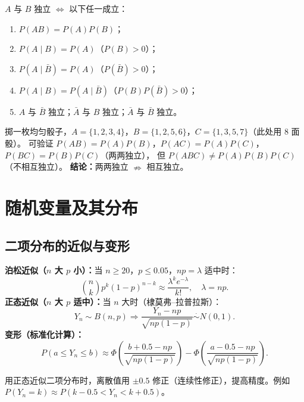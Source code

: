 \documentclass[11pt,a4paper]{article}
\begin{document}
\begin{variation}[独立性的等价表述]
$A$ 与 $B$ 独立 $\iff$ 以下任一成立：
\begin{enumerate}[leftmargin=2em]
  \item $P(AB)=P(A)P(B)$；
  \item $P(A\mid B)=P(A)$（$P(B)>0$）；
  \item $P(A\mid \bar B)=P(A)$（$P(\bar B)>0$）；
  \item $P(A\mid B)=P(A\mid \bar B)$（$P(B)P(\bar B)>0$）；
  \item $A$ 与 $\bar B$ 独立；$\bar A$ 与 $B$ 独立；$\bar A$ 与 $\bar B$ 独立。
\end{enumerate}
\end{variation}

\begin{examtip}
掷一枚均匀骰子，$A=\{1,2,3,4\}$，$B=\{1,2,5,6\}$，$C=\{1,3,5,7\}$（此处用 8 面骰）。
可验证 $P(AB)=P(A)P(B)$，$P(AC)=P(A)P(C)$，$P(BC)=P(B)P(C)$（两两独立），
但 $P(ABC)\neq P(A)P(B)P(C)$（不相互独立）。
\textbf{结论：}两两独立 $\nRightarrow$ 相互独立。
\end{examtip}

\section{随机变量及其分布}

\subsection{二项分布的近似与变形}

\begin{variation}[二项分布的两种近似]
\textbf{泊松近似（$n$ 大 $p$ 小）：}当 $n\geq 20$，$p\leq 0.05$，$np=\lambda$ 适中时：
\[
\binom{n}{k}p^k(1-p)^{n-k} \approx \frac{\lambda^k e^{-\lambda}}{k!}, \quad \lambda=np.
\]
\textbf{正态近似（$n$ 大 $p$ 适中）：}当 $n$ 大时（棣莫弗--拉普拉斯）：
\[
Y_n \sim B(n,p) \Rightarrow \frac{Y_n - np}{\sqrt{np(1-p)}} \overset{\cdot}{\sim} N(0,1).
\]
\textbf{变形（标准化计算）：}
\[
P(a \leq Y_n \leq b) \approx \Phi\!\left(\frac{b+0.5-np}{\sqrt{np(1-p)}}\right) - \Phi\!\left(\frac{a-0.5-np}{\sqrt{np(1-p)}}\right).
\]
\end{variation}

\begin{examtip}[连续性修正]
用正态近似二项分布时，离散值用 $\pm 0.5$ 修正（连续性修正），提高精度。例如 $P(Y_n=k)\approx P(k-0.5<Y_n<k+0.5)$。
\end{examtip}
\end{document}
